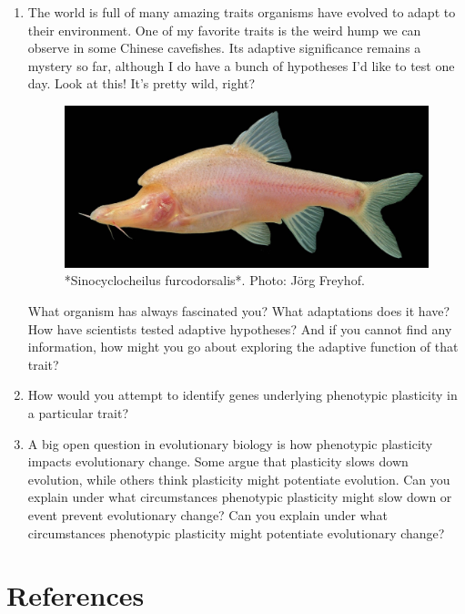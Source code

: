 \documentclass[
]{book}
\begin{document}
\begin{enumerate}
\def\labelenumi{\arabic{enumi}.}
\item
  The world is full of many amazing traits organisms have evolved to adapt to their environment. One of my favorite traits is the weird hump we can observe in some Chinese cavefishes. Its adaptive significance remains a mystery so far, although I do have a bunch of hypotheses I'd like to test one day. Look at this! It's pretty wild, right?

  \begin{figure}
  \includegraphics[width=1\linewidth]{images/sinocyclocheilus} \caption{*Sinocyclocheilus furcodorsalis*. Photo: Jörg Freyhof.}\label{fig:sinocyclocheilus}
  \end{figure}

  What organism has always fascinated you? What adaptations does it have? How have scientists tested adaptive hypotheses? And if you cannot find any information, how might you go about exploring the adaptive function of that trait?
\item
  How would you attempt to identify genes underlying phenotypic plasticity in a particular trait?
\item
  A big open question in evolutionary biology is how phenotypic plasticity impacts evolutionary change. Some argue that plasticity slows down evolution, while others think plasticity might potentiate evolution. Can you explain under what circumstances phenotypic plasticity might slow down or event prevent evolutionary change? Can you explain under what circumstances phenotypic plasticity might potentiate evolutionary change?
\end{enumerate}

\hypertarget{references-9}{%
\section{References}\label{references-9}}
\end{document}

